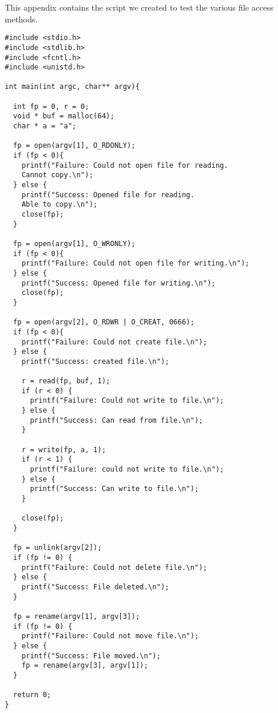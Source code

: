 \label{app:A}



This appendix contains the script we created to test the various file access methods.
\selectfont
\begin{lstlisting}[style=CStyle]
#include <stdio.h>
#include <stdlib.h>
#include <fcntl.h>
#include <unistd.h>

int main(int argc, char** argv){

  int fp = 0, r = 0;
  void * buf = malloc(64);
  char * a = "a";

  fp = open(argv[1], O_RDONLY);
  if (fp < 0){
    printf("Failure: Could not open file for reading. 
    Cannot copy.\n");
  } else {
    printf("Success: Opened file for reading. 
    Able to copy.\n");
    close(fp);
  }

  fp = open(argv[1], O_WRONLY);
  if (fp < 0){
    printf("Failure: Could not open file for writing.\n");
  } else {
    printf("Success: Opened file for writing.\n");
    close(fp);
  }

  fp = open(argv[2], O_RDWR | O_CREAT, 0666);
  if (fp < 0){
    printf("Failure: Could not create file.\n");
  } else {
    printf("Success: created file.\n");

    r = read(fp, buf, 1);
    if (r < 0) {
      printf("Failure: Could not write to file.\n");
    } else {
      printf("Success: Can read from file.\n");
    }

    r = write(fp, a, 1);
    if (r < 1) {
      printf("Failure: could not write to file.\n");
    } else {
      printf("Success: Can write to file.\n");
    }

    close(fp);
  }

  fp = unlink(argv[2]);
  if (fp != 0) {
    printf("Failure: Could not delete file.\n");
  } else {
    printf("Success: File deleted.\n");
  }

  fp = rename(argv[1], argv[3]);
  if (fp != 0) {
    printf("Failure: Could not move file.\n");
  } else {
    printf("Success: File moved.\n");
    fp = rename(argv[3], argv[1]);
  }

  return 0;
}

\end{lstlisting}
\selectfont